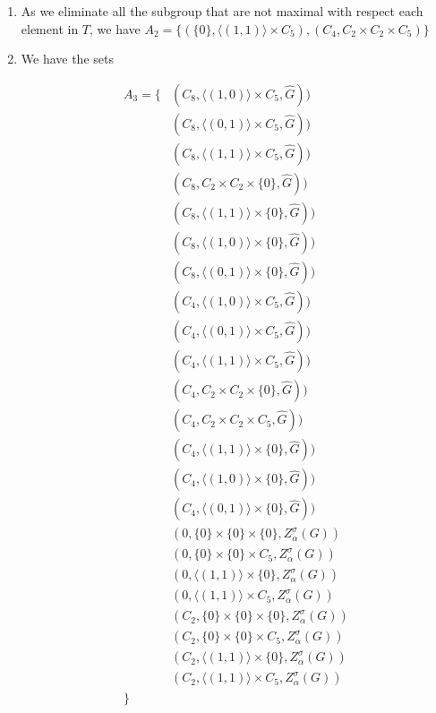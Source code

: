 \documentclass{article}
\begin{document}
\begin{enumerate}
So we have $T=\{1,4\}$. 

\item As we eliminate all the subgroup that are not maximal with respect each element in $T$, we have $A_2=\{ (\{0\}, \langle (1,1) \rangle\times C_5), ( C_4, C_2 \times C_2 \times C_5 ) \}$

\item We have the sets 

\begin{align*}
    A_3 = \{   & (C_8,\langle (1,0) \rangle \times C_5, \hat{G}))\\
    & (C_8,\langle (0,1) \rangle \times C_5, \hat{G}))\\
    & (C_8,\langle (1,1) \rangle \times C_5, \hat{G})) \\
     & (C_8, C_2 \times C_2 \times \{0\}, \hat{G}))\\
    & (C_8, \langle (1,1) \rangle \times \{0\}, \hat{G}))\\   
    & (C_8,\langle (1,0) \rangle \times \{0\}, \hat{G}))\\
    & (C_8,\langle (0,1) \rangle \times \{0\}, \hat{G}))\\
    & (C_4,\langle (1,0) \rangle \times C_5, \hat{G}))\\
    & (C_4,\langle (0,1) \rangle \times C_5, \hat{G}))\\
    & (C_4,\langle (1,1) \rangle \times C_5, \hat{G}))\\
    & (C_4, C_2 \times C_2 \times \{0\}, \hat{G}))\\
        & (C_4, C_2 \times C_2 \times C_5, \hat{G}))\\
        & (C_4, \langle (1,1) \rangle \times \{0\}, \hat{G}))\\
        & (C_4,\langle (1,0) \rangle \times \{0\}, \hat{G}))\\
    & (C_4,\langle (0,1) \rangle \times \{0\}, \hat{G}))\\
    & (0, \{0\} \times \{0\} \times \{0\}, Z_\alpha^\sigma(G))\\
    & (0, \{0\} \times \{0\} \times C_5, Z_\alpha^\sigma(G))\\
    & (0, \langle (1,1) \rangle \times \{0\}, Z_\alpha^\sigma(G))\\
    & (0, \langle (1,1) \rangle \times C_5, Z_\alpha^\sigma(G))\\
    & (C_2, \{0\} \times \{0\} \times \{0\}, Z_\alpha^\sigma(G))\\
    & (C_2, \{0\} \times \{0\} \times C_5, Z_\alpha^\sigma(G))\\
    & (C_2, \langle (1,1) \rangle \times \{0\}, Z_\alpha^\sigma(G))\\
    & (C_2, \langle (1,1) \rangle \times C_5, Z_\alpha^\sigma(G))\\
     \}
\end{align*}


\end{enumerate}
\end{document}
